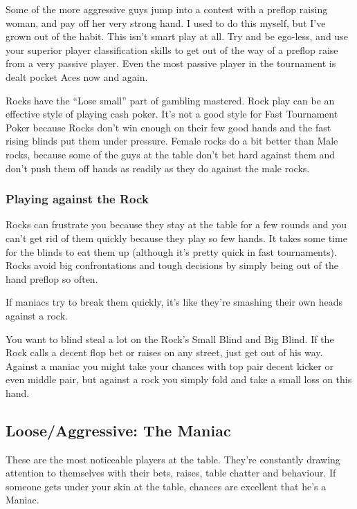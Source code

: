 Some of the more aggressive guys jump into a contest with a
preflop raising woman, and pay off her very strong hand. I
used to do this myself, but I've grown out of the habit. This
isn't smart play at all. Try and be ego-less, and use your
superior player classification skills to get out of the way
of a preflop raise from a very passive player. Even the most
passive player in the tournament is dealt pocket Aces now and
again.

Rocks have the ``Lose small'' part of gambling mastered. Rock play
can be an effective style of playing cash poker. It's not a
good style for Fast Tournament Poker because Rocks don't win enough
on their few good hands and the fast rising blinds put them
under pressure. Female rocks do a bit better than Male rocks, because
some of the guys at the table don't bet hard against them and don't
push them off hands as readily as they do against the male rocks.

\subsubsection{Playing against the Rock}

Rocks can frustrate you because they stay at the table for a few rounds
and you can't get rid of them quickly because they play so few hands.
It takes some time for the blinds to eat them up (although it's
pretty quick in fast tournaments). Rocks avoid big confrontations
and tough decisions by simply being out of the hand preflop so often.

If maniacs try to break them quickly,
it's like they're smashing their own heads against a rock.

You want to blind steal a lot on the Rock's Small Blind and Big Blind.
If the Rock calls a decent flop bet or raises on any street, just get
out of his way. Against a maniac you might take your chances with
top pair decent kicker or even middle pair, but against a rock you
simply fold and take a small loss on this hand.

\subsection{Loose/Aggressive: The Maniac}

These are the most noticeable players at the table. They're constantly
drawing attention to themselves with their bets, raises, table chatter
and behaviour. If someone gets under your skin at the table, chances
are excellent that he's a Maniac.

